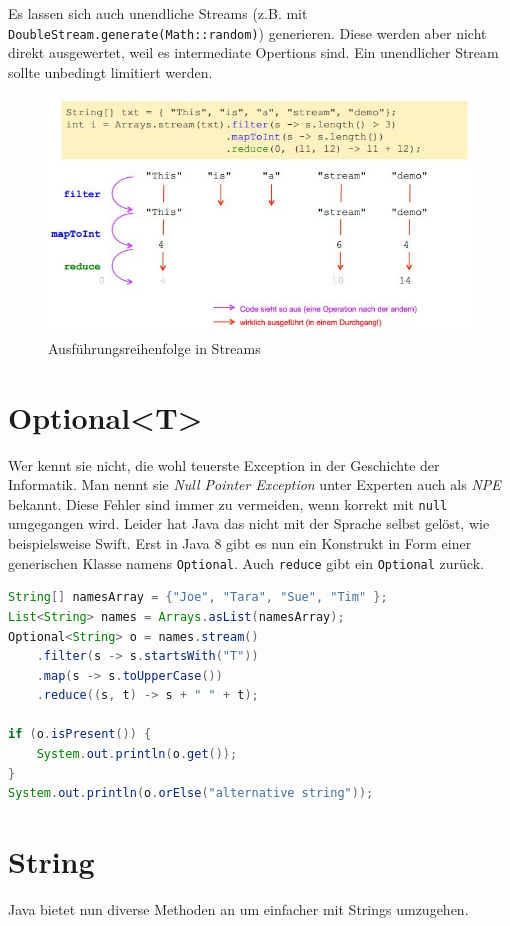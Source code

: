 Es lassen sich auch unendliche Streams (z.B. mit \verb|DoubleStream.generate(Math::random)|) generieren. Diese werden aber nicht direkt ausgewertet, weil es intermediate Opertions sind. Ein unendlicher Stream sollte unbedingt limitiert werden.

\begin{figure}[h!]
\centering
\includegraphics[width=0.6\linewidth]{fig/java-stream-executions}
\caption{Ausführungsreihenfolge in Streams}
\label{fig:java-stream-executions}
\end{figure}

\newpage
\section{Optional<T>}
Wer kennt sie nicht, die wohl teuerste Exception in der Geschichte der Informatik. Man nennt sie \emph{Null Pointer Exception} unter Experten auch als \emph{NPE} bekannt. Diese Fehler sind immer zu vermeiden, wenn korrekt mit \verb|null| umgegangen wird. Leider hat Java das nicht mit der Sprache selbst gelöst, wie beispielsweise Swift. Erst in Java 8 gibt es nun ein Konstrukt in Form einer generischen Klasse namens \verb|Optional|. Auch \verb|reduce| gibt ein \verb|Optional| zurück.

\begin{lstlisting}[language=Java, caption=Optional]
String[] namesArray = {"Joe", "Tara", "Sue", "Tim" };
List<String> names = Arrays.asList(namesArray);
Optional<String> o = names.stream()
	.filter(s -> s.startsWith("T"))
	.map(s -> s.toUpperCase())
	.reduce((s, t) -> s + " " + t);
	
if (o.isPresent()) {
	System.out.println(o.get());
}
System.out.println(o.orElse("alternative string"));
\end{lstlisting}

\section{String}
Java bietet nun diverse Methoden an um einfacher mit Strings umzugehen.

